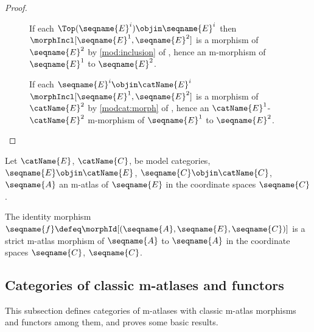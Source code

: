 \documentclass{article}
\begin{document}
\begin{lemma}
\begin{proof}
\begin{description}
\item%
  [
    \ensuremath
      {
        \morphIncl%
          [
            {(\seqname{E}^1,\seqname{C}^1)},
            {(\seqname{E}^2,\seqname{C}^2)}
          ]
      }
    is strict:
  ]


If each $\Top(\seqname{E}^i) \objin \seqname{E}^i$ then
$\morphIncl[{\seqname{E}^1},{\seqname{E}^2}]$ is a morphism of
$\seqname{E}^2$ by \cref{mod:inclusion} of
{
  \showlabelsinline
},
hence an m-morphism of $\seqname{E}^1$ to $\seqname{E}^2$.

If each
$\seqname{E}^i \objin \catName{E}^i$
$\morphIncl[{\seqname{E}^1},{\seqname{E}^2}]$ is a morphism of
$\catName{E}^2$ by \cref{modcat:morph} of
{
  \showlabelsinline
},
hence an $\catName{E}^1$-$\catName{E}^2$ m-morphism of $\seqname{E}^1$
to $\seqname{E}^2$.
\end{description}
\end{proof}
\end{lemma}

\begin{corollary}
\label{cor:M-ATLcid}
Let $\catName{E}$, $\catName{C}$, be model categories,
$\seqname{E} \objin \catName{E}$,
$\seqname{C} \objin \catName{C}$,
$\seqname{A}$ an m-atlas of
$\seqname{E}$ in the coordinate spaces $\seqname{C}$.

The identity morphism
$\seqname{f} \defeq \morphId[{{(\seqname{A}, \seqname{E}, \seqname{C})}}]$ is a
strict m-atlas morphism of $\seqname{A}$ to $\seqname{A}$ in the
coordinate spaces $\seqname{C}$, $\seqname{C}$.
\end{corollary}

\subsection{Categories of classic m-atlases and functors}
\label{sub:C-cat}
This subsection defines categories of m-atlases with classic m-atlas
morphisms and functors among them, and proves some basic results.
\end{document}
